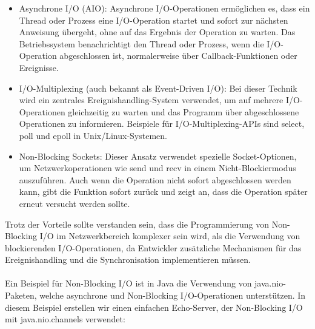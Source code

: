 \documentclass[../vs-script-first-v01.tex]{subfiles}
\begin{document}
\begin{itemize}
\item Asynchrone I/O (AIO): Asynchrone I/O-Operationen ermöglichen es, dass ein Thread oder Prozess eine I/O-Operation startet und sofort zur nächsten Anweisung übergeht, ohne auf das Ergebnis der Operation zu warten. Das Betriebssystem benachrichtigt den Thread oder Prozess, wenn die I/O-Operation abgeschlossen ist, normalerweise über Callback-Funktionen oder Ereignisse.
\item I/O-Multiplexing (auch bekannt als Event-Driven I/O): Bei dieser Technik wird ein zentrales Ereignishandling-System verwendet, um auf mehrere I/O-Operationen gleichzeitig zu warten und das Programm über abgeschlossene Operationen zu informieren. Beispiele für I/O-Multiplexing-APIs sind select, poll und epoll in Unix/Linux-Systemen.
\item Non-Blocking Sockets: Dieser Ansatz verwendet spezielle Socket-Optionen, um Netzwerkoperationen wie send und recv in einem Nicht-Blockiermodus auszuführen. Auch wenn die Operation nicht sofort abgeschlossen werden kann, gibt die Funktion sofort zurück und zeigt an, dass die Operation später erneut versucht werden sollte.
\end{itemize}
Trotz der Vorteile sollte verstanden sein, dass die Programmierung von Non-Blocking I/O im Netzwerkbereich komplexer sein wird, als die Verwendung von blockierenden I/O-Operationen, da Entwickler zusätzliche Mechanismen für das Ereignishandling und die Synchronisation implementieren müssen.
\\\\
Ein Beispiel für Non-Blocking I/O ist in Java die Verwendung von java.nio-Paketen, welche asynchrone und Non-Blocking I/O-Operationen unterstützen. In diesem Beispiel erstellen wir einen einfachen Echo-Server, der Non-Blocking I/O mit java.nio.channels verwendet:
\end{document}
